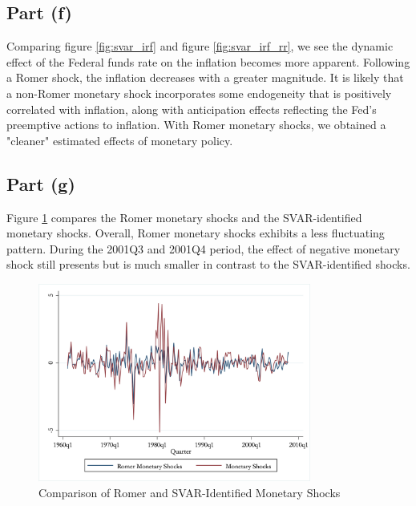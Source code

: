 \documentclass[12pt]{article}
\begin{document}
\subsection*{Part (f)} 

Comparing figure \ref{fig:svar_irf} and figure \ref{fig:svar_irf_rr}, 
we see the dynamic effect of the Federal funds rate on the inflation becomes more apparent. Following a Romer shock, the inflation decreases with a greater magnitude. 
It is likely that a non-Romer monetary shock incorporates some endogeneity that is positively correlated with inflation, 
along with anticipation effects reflecting the Fed's preemptive actions to inflation. 
With Romer monetary shocks, we obtained a "cleaner" estimated effects of monetary policy. 

\subsection*{Part (g)} 

Figure \ref{fig:compare_shocks} compares the Romer monetary shocks and the SVAR-identified monetary shocks. 
Overall, Romer monetary shocks exhibits a less fluctuating pattern. During the 2001Q3 and 2001Q4 period, the effect of negative monetary shock still presents but is much smaller in contrast to the SVAR-identified shocks.

\begin{figure}[ht]
    \centering
    \includegraphics[width=0.8\textwidth]{figs/compare_monetary_shocks}
    \caption{Comparison of Romer and SVAR-Identified Monetary Shocks}
    \label{fig:compare_shocks}
\end{figure}
\end{document}
